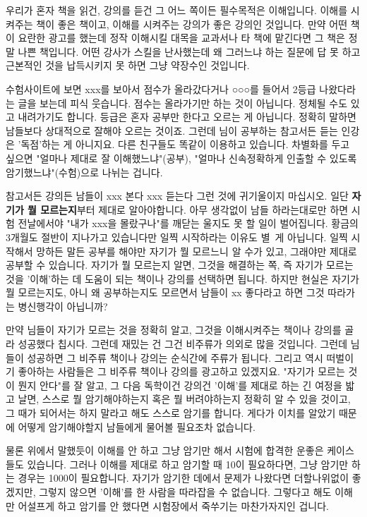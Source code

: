 우리가 혼자 책을 읽건, 강의를 듣건 그 어느 쪽이든 필수목적은 이해입니다.
이해를 시켜주는 책이 좋은 책이고, 이해를 시켜주는 강의가 좋은 강의인 것입니다.
만약 어떤 책이 요란한 광고를 했는데 정작 이해시킬 대목을 교과서나 타 책에 맡긴다면 그 책은 정말 나쁜 책입니다.
어떤 강사가 스킬을 난사했는데 왜 그러느냐 하는 질문에 답 못 하고 근본적인 것을 납득시키지 못 하면 그냥 약장수인 것입니다.
\vspace{5mm}

수험사이트에 보면 xxx를 보아서 점수가 올라갔다거나 ○○○를 들어서 2등급 나왔다라는 글을 보는데 피식 웃습니다.
점수는 올라가기만 하는 것이 아닙니다. 정체될 수도 있고 내려가기도 합니다.
등급은 혼자 공부만 한다고 오르는 게 아닙니다. 정확히 말하면 남들보다 상대적으로 잘해야 오르는 것이죠.
그런데 님이 공부하는 참고서든 듣는 인강은 '독점'하는 게 아니지요. 다른 친구들도 똑같이 이용하고 있습니다.
차별화를 두고 싶으면 "얼마나 제대로 잘 이해했느냐"(공부), "얼마나 신속정확하게 인출할 수 있도록 암기했느냐"(수험)으로 나뉘는 겁니다.
\vspace{5mm}

참고서든 강의든 남들이 xxx 본다 xxx 듣는다 그런 것에 귀기울이지 마십시오.
일단 \textbf{자기가 뭘 모르는지}부터 제대로 알아야합니다.
아무 생각없이 남들 하라는대로만 하면 시험 전날에서야 "내가 xxx을 몰랐구나"를 깨닫는 울지도 못 할 일이 벌어집니다.
황금의 3개월도 절반이 지나가고 있습니다만 일찍 시작하라는 이유도 별 게 아닙니다.
일찍 시작해서 망하든 말든 공부를 해야만 자기가 뭘 모르느니 알 수가 있고, 그래야만 제대로 공부할 수 있습니다.
자기가 뭘 모르는지 알면, 그것을 해결하는 쪽, 즉 자기가 모르는 것을 '이해'하는 데 도움이 되는 책이나 강의를 선택하면 됩니다.
하지만 현실은 자기가 뭘 모르는지도, 아니 왜 공부하는지도 모르면서 남들이 xx 좋다라고 하면 그것 따라가는 병신행각이 아닙니까?
\vspace{5mm}

만약 님들이 자기가 모르는 것을 정확히 알고, 그것을 이해시켜주는 책이나 강의를 골라 성공했다 칩시다.
그런데 재밌는 건 그건 비주류가 의외로 많을 것입니다. 그런데 님들이 성공하면 그 비주류 책이나 강의는 순식간에 주류가 됩니다.
그리고 역시 떠벌이기 좋아하는 사람들은 그 비주류 책이나 강의를 광고하고 있겠지요.
"자기가 모르는 것이 뭔지 안다"를 잘 알고, 그 다음 독학이건 강의건 '이해'를 제대로 하는 긴 여정을 밟고 날면,
스스로 뭘 암기해야하는지 혹은 뭘 버려야하는지 정확히 알 수 있을 것이고, 그 때가 되어서는 하지 말라고 해도 스스로 암기를 합니다.
게다가 이치를 알았기 때문에 어떻게 암기해야할지 남들에게 물어볼 필요조차 없습니다.
\vspace{5mm}

물론 위에서 말했듯이 이해를 안 하고 그냥 암기만 해서 시험에 합격한 운좋은 케이스들도 있습니다.
그러나 이해를 제대로 하고 암기할 때 10이 필요하다면, 그냥 암기만 하는 경우는 1000이 필요합니다.
자기가 암기한 데에서 문제가 나왔다면 더할나위없이 좋겠지만, 그렇지 않으면 '이해'를 한 사람을 따라잡을 수 없습니다.
그렇다고 해도 이해만 어설프게 하고 암기를 안 했다면 시험장에서 죽쑤기는 마찬가자지인 겁니다.
\vspace{5mm}

